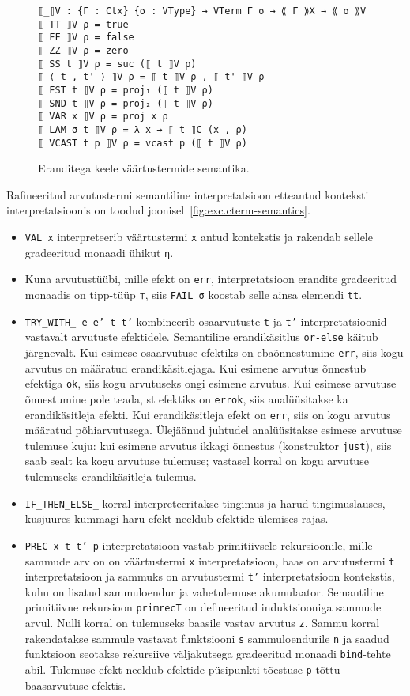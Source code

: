 \documentclass[a4paper,12pt]{article}
\begin{document}
\begin{figure}
  \begin{BVerbatim}
⟦_⟧V : {Γ : Ctx} {σ : VType} → VTerm Γ σ → ⟪ Γ ⟫X → ⟪ σ ⟫V
⟦ TT ⟧V ρ = true
⟦ FF ⟧V ρ = false
⟦ ZZ ⟧V ρ = zero
⟦ SS t ⟧V ρ = suc (⟦ t ⟧V ρ)
⟦ ⟨ t , t' ⟩ ⟧V ρ = ⟦ t ⟧V ρ , ⟦ t' ⟧V ρ
⟦ FST t ⟧V ρ = proj₁ (⟦ t ⟧V ρ)
⟦ SND t ⟧V ρ = proj₂ (⟦ t ⟧V ρ)
⟦ VAR x ⟧V ρ = proj x ρ
⟦ LAM σ t ⟧V ρ = λ x → ⟦ t ⟧C (x , ρ)
⟦ VCAST t p ⟧V ρ = vcast p (⟦ t ⟧V ρ)
  \end{BVerbatim}
  \caption{Eranditega keele väärtustermide semantika.}
  \label{fig:exc.vterm-semantics}
\end{figure}

Rafineeritud arvutustermi semantiline interpretatsioon etteantud konteksti interpretatsioonis on toodud joonisel~\ref{fig:exc.cterm-semantics}.
\begin{itemize}
\item {\tt VAL x} interpreteerib väärtustermi {\tt x} antud kontekstis ja rakendab sellele gradeeritud monaadi ühikut {\tt η}.
\item Kuna arvutustüübi, mille efekt on {\tt err}, interpretatsioon erandite gradeeritud monaadis on tipp-tüüp {\tt ⊤}, siis {\tt FAIL σ} koostab selle ainsa elemendi {\tt tt}.
\item {\tt TRY_WITH_ {e} {e'} t t'} kombineerib osaarvutuste {\tt t} ja {\tt t'} interpretatsioonid vastavalt arvutuste efektidele. Semantiline erandikäsitlus {\tt or-else} käitub järgnevalt. Kui esimese osaarvutuse efektiks on ebaõnnestumine {\tt err}, siis kogu arvutus on määratud erandikäsitlejaga. Kui esimene arvutus õnnestub efektiga {\tt ok}, siis kogu arvutuseks ongi esimene arvutus. Kui esimese arvutuse õnnestumine pole teada, st efektiks on {\tt errok}, siis analüüsitakse ka erandikäsitleja efekti. Kui erandikäsitleja efekt on {\tt err}, siis on kogu arvutus määratud põhiarvutusega. Ülejäänud juhtudel analüüsitakse esimese arvutuse tulemuse kuju: kui esimene arvutus ikkagi õnnestus (konstruktor {\tt just}), siis saab sealt ka kogu arvutuse tulemuse; vastasel korral on kogu arvutuse tulemuseks erandikäsitleja tulemus.
\item {\tt IF_THEN_ELSE_} korral interpreteeritakse tingimus ja harud tingimuslauses, kusjuures kummagi haru efekt neeldub efektide ülemises rajas.
\item {\tt PREC x t t' p} interpretatsioon vastab primitiivsele rekursioonile, mille sammude arv on on väärtustermi {\tt x} interpretatsioon, baas on arvutustermi {\tt t} interpretatsioon ja sammuks on arvutustermi {\tt t'} interpretatsioon kontekstis, kuhu on lisatud sammuloendur ja vahetulemuse akumulaator. Semantiline primitiivne rekursioon {\tt primrecT} on defineeritud induktsiooniga sammude arvul. Nulli korral on tulemuseks baasile vastav arvutus {\tt z}. Sammu korral rakendatakse sammule vastavat funktsiooni {\tt s} sammuloendurile {\tt n} ja saadud funktsioon seotakse rekursiive väljakutsega gradeeritud monaadi {\tt bind}-tehte abil. Tulemuse efekt neeldub efektide püsipunkti tõestuse {\tt p} tõttu baasarvutuse efektis.

\end{itemize}
\end{document}
